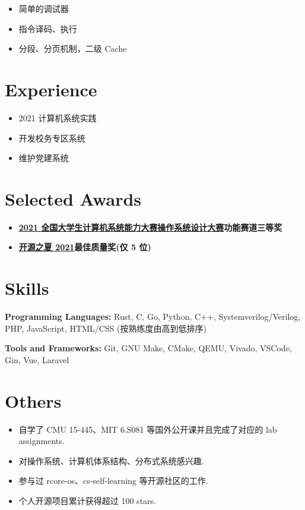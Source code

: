 \documentclass{resume}
\begin{document}
\begin{itemize}
  \item 简单的调试器
  \item 指令译码、执行
  \item 分段、分页机制，二级 Cache
\end{itemize}

\section{Experience}
\begin{itemize}
  \item 2021 计算机系统实践
\end{itemize}

\begin{itemize}
  \item 开发校务专区系统
  \item 维护党建系统
\end{itemize}


\section{Selected Awards}
\begin{itemize}
  \item \textbf{\href{https://os.educg.net/2021CSCC}{2021 全国大学生计算机系统能力大赛操作系统设计大赛}}\quad \textbf{功能赛道三等奖}
  \item \textbf{\href{ https://summer-ospp.ac.cn/ }{开源之夏 2021}}\quad \textbf{最佳质量奖(仅 5 位)}
\end{itemize}



\section{Skills}
\textbf{Programming Languages:} \small Rust, C, Go, Python, C++, Systemverilog/Verilog, PHP, JavaScript, HTML/CSS (按熟练度由高到低排序)

\textbf{Tools and Frameworks:} \small Git, GNU Make, CMake, QEMU, Vivado, VSCode, Gin, Vue, Laravel

\section{Others}
\begin{itemize}
  \item 自学了 CMU 15-445、MIT 6.S081 等国外公开课并且完成了对应的 lab assignments.
  \item 对操作系统、计算机体系结构、分布式系统感兴趣.
  \item 参与过 rcore-os、cs-self-learning 等开源社区的工作.
  \item 个人开源项目累计获得超过 100 stars.
\end{itemize}
\end{document}
